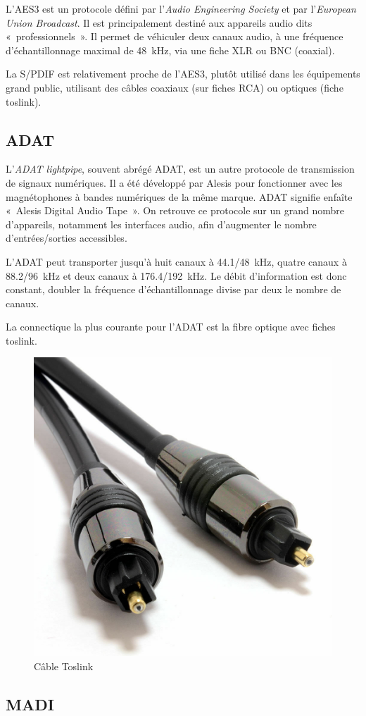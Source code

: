 \documentclass[
]{book}
\begin{document}
L'AES3 est un protocole défini par l'\emph{Audio Engineering Society} et par l'\emph{European Union Broadcast}. Il est principalement destiné aux appareils audio dits «~professionnels~». Il permet de véhiculer deux canaux audio, à une fréquence d'échantillonnage maximal de 48~kHz, via une fiche XLR ou BNC (coaxial).

La S/PDIF est relativement proche de l'AES3, plutôt utilisé dans les équipements grand public, utilisant des câbles coaxiaux (sur fiches RCA) ou optiques (fiche toslink).

\hypertarget{adat}{%
\subsection{ADAT}\label{adat}}

L'\emph{ADAT lightpipe}, souvent abrégé ADAT, est un autre protocole de transmission de signaux numériques. Il a été développé par Alesis pour fonctionner avec les magnétophones à bandes numériques de la même marque. ADAT signifie enfaîte «~Alesis Digital Audio Tape~». On retrouve ce protocole sur un grand nombre d'appareils, notamment les interfaces audio, afin d'augmenter le nombre d'entrées/sorties accessibles.

L'ADAT peut transporter jusqu'à huit canaux à 44.1/48~kHz, quatre canaux à 88.2/96~kHz et deux canaux à 176.4/192~kHz. Le débit d'information est donc constant, doubler la fréquence d'échantillonnage divise par deux le nombre de canaux.

La connectique la plus courante pour l'ADAT est la fibre optique avec fiches toslink.

\begin{figure}

{\centering \includegraphics[width=0.3\linewidth]{_resources/bitmap/plug/toslink} 

}

\caption{Câble Toslink}\label{fig:unnamed-chunk-32}
\end{figure}

\hypertarget{madi}{%
\subsection{MADI}\label{madi}}
\end{document}

